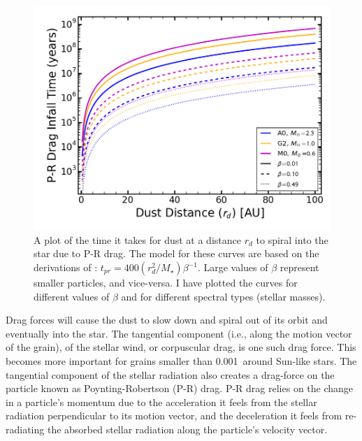     \begin{figure}
    \centering
    \includegraphics[width=\textwidth]{Ch1/PR_Drag_time} 
    \caption[Poynting-Robertson Drag Timescales]{A plot of the time it takes for dust at a distance $r_d$ to spiral into the star due to P-R drag. The model for these curves are based on the derivations of \citet{Burns1979}: $t_{pr}=400(r_d^2/M_\star)\beta^{-1}$. Large values of $\beta$ represent smaller particles, and vice-versa. I have plotted the curves for different values of $\beta$ and for different spectral types (stellar masses).}
    \label{fig:PR_Drag_time}
    \end{figure}
    
    Drag forces will cause the dust to slow down and spiral out of its orbit and eventually into the star. The tangential component (i.e., along the motion vector of the grain), of the stellar wind, or corpuscular drag, is one such drag force. This becomes more important for grains smaller than 0.001\micron\ around Sun-like stars\citep{Burns1979}. The tangential component of the stellar radiation also creates a drag-force on the particle known as Poynting-Robertson (P-R) drag. P-R drag relies on the change in a particle's momentum due to the acceleration it feels from the stellar radiation perpendicular to its motion vector, and the deceleration it feels from re-radiating the absorbed stellar radiation along the particle's velocity vector. 
    
